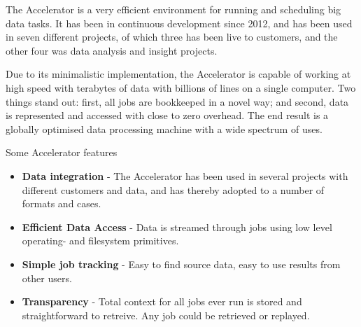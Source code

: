 
The Accelerator is a very efficient environment for running and
scheduling big data tasks.  It has been in continuous development
since 2012, and has been used in seven different projects, of which
three has been live to customers, and the other four was data analysis
and insight projects.

Due to its minimalistic implementation, the Accelerator is capable of
working at high speed with terabytes of data with billions of lines on
a single computer.  Two things stand out: first, all jobs are
bookkeeped in a novel way; and second, data is represented and
accessed with close to zero overhead.  The end result is a globally
optimised data processing machine with a wide spectrum of uses.

Some Accelerator features
\begin{itemize}
\item \textbf{Data integration} - The Accelerator has been used in
  several projects with different customers and data, and has thereby
  adopted to a number of formats and cases.
\item \textbf{Efficient Data Access} - Data is streamed through jobs
  using low level operating- and filesystem primitives.
\item \textbf{Simple job tracking} - Easy to find source data, easy to
  use results from other users.
\item \textbf{Transparency} - Total context for all jobs ever run is
  stored and straightforward to retreive.  Any job could be retrieved
  or replayed.
\end{itemize}
